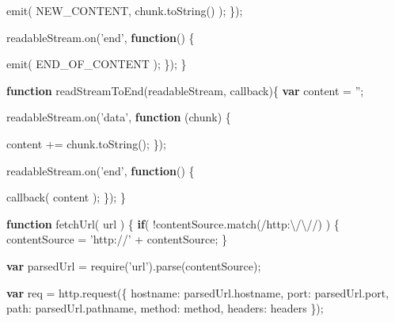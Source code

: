 \documentclass[]{article}
\newenvironment{Shaded}{}{}
\newcommand{\KeywordTok}[1]{\textcolor[rgb]{0.00,0.44,0.13}{\textbf{{#1}}}}
\newcommand{\DataTypeTok}[1]{\textcolor[rgb]{0.56,0.13,0.00}{{#1}}}
\newcommand{\FloatTok}[1]{\textcolor[rgb]{0.25,0.63,0.44}{{#1}}}
\newcommand{\StringTok}[1]{\textcolor[rgb]{0.25,0.44,0.63}{{#1}}}
\newcommand{\OtherTok}[1]{\textcolor[rgb]{0.00,0.44,0.13}{{#1}}}
\newcommand{\FunctionTok}[1]{\textcolor[rgb]{0.02,0.16,0.49}{{#1}}}
\newcommand{\NormalTok}[1]{{#1}}
\begin{document}
\begin{Shaded}
\begin{Highlighting}[]
         \FunctionTok{emit}\NormalTok{( NEW_CONTENT, }\OtherTok{chunk}\NormalTok{.}\FunctionTok{toString}\NormalTok{() );}
      \NormalTok{\});}
      
      \OtherTok{readableStream}\NormalTok{.}\FunctionTok{on}\NormalTok{(}\StringTok{'end'}\NormalTok{, }\KeywordTok{function}\NormalTok{() \{}
               
         \FunctionTok{emit}\NormalTok{( END_OF_CONTENT );}
      \NormalTok{\});}
   \NormalTok{\}}
   
   \KeywordTok{function} \FunctionTok{readStreamToEnd}\NormalTok{(readableStream, callback)\{}
      \KeywordTok{var} \NormalTok{content = }\StringTok{''}\NormalTok{;}
   
      \OtherTok{readableStream}\NormalTok{.}\FunctionTok{on}\NormalTok{(}\StringTok{'data'}\NormalTok{, }\KeywordTok{function} \NormalTok{(chunk) \{}
                                             
         \NormalTok{content += }\OtherTok{chunk}\NormalTok{.}\FunctionTok{toString}\NormalTok{();}
      \NormalTok{\});}
      
      \OtherTok{readableStream}\NormalTok{.}\FunctionTok{on}\NormalTok{(}\StringTok{'end'}\NormalTok{, }\KeywordTok{function}\NormalTok{() \{}
               
         \FunctionTok{callback}\NormalTok{( content );}
      \NormalTok{\});}
   \NormalTok{\}}
   
   \KeywordTok{function} \FunctionTok{fetchUrl}\NormalTok{( url ) \{}
      \KeywordTok{if}\NormalTok{( !}\OtherTok{contentSource}\NormalTok{.}\FunctionTok{match}\NormalTok{(}\OtherTok{/http:}\FloatTok{\textbackslash{}/\textbackslash{}/}\OtherTok{/}\NormalTok{) ) \{}
         \NormalTok{contentSource = }\StringTok{'http://'} \NormalTok{+ contentSource;}
      \NormalTok{\}                           }
                           
      \KeywordTok{var} \NormalTok{parsedUrl = }\FunctionTok{require}\NormalTok{(}\StringTok{'url'}\NormalTok{).}\FunctionTok{parse}\NormalTok{(contentSource); }
   
      \KeywordTok{var} \NormalTok{req = }\OtherTok{http}\NormalTok{.}\FunctionTok{request}\NormalTok{(\{}
         \DataTypeTok{hostname}\NormalTok{: }\OtherTok{parsedUrl}\NormalTok{.}\FunctionTok{hostname}\NormalTok{,}
         \DataTypeTok{port}\NormalTok{: }\OtherTok{parsedUrl}\NormalTok{.}\FunctionTok{port}\NormalTok{, }
         \DataTypeTok{path}\NormalTok{: }\OtherTok{parsedUrl}\NormalTok{.}\FunctionTok{pathname}\NormalTok{,}
         \DataTypeTok{method}\NormalTok{: method,}
         \DataTypeTok{headers}\NormalTok{: headers }
      \NormalTok{\});}
      

\end{Highlighting}
\end{Shaded}
\end{document}
